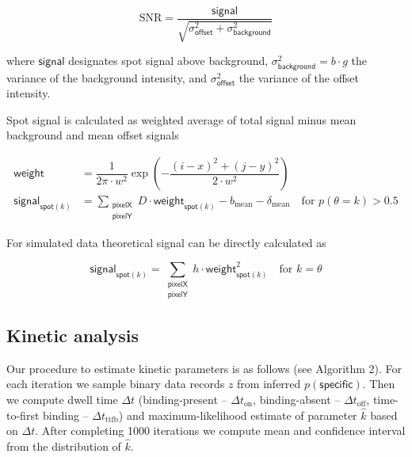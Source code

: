 \begin{equation}
    \mathrm{SNR} = \dfrac{\mathsf{signal}}{\sqrt{\sigma^2_{\mathsf{offset}} + \sigma^2_{\mathsf{background}}}}
\end{equation}

where $\mathsf{signal}$ designates spot signal above background, $\sigma^2_{\mathsf{background}} = b \cdot g$ the variance of the background intensity, and $\sigma^2_{\mathsf{offset}}$ the variance of the offset intensity.

Spot signal is calculated as weighted average of total signal minus mean background and mean offset signals

\begin{subequations}
\begin{align}
    \mathsf{weight} &= \dfrac{1}{2 \pi \cdot w^2} \exp{\left( -\dfrac{(i-x)^2 + (j-y)^2}{2 \cdot w^2} \right)} \\
    \mathsf{signal}_{\mathsf{spot}(k)} &=  \sum_{\substack{\mathsf{pixelX} \\ \mathsf{pixelY}}} D \cdot \mathsf{weight}_{\mathsf{spot}(k)} - b_{\mathrm{mean}} - \delta_\mathrm{mean} \quad \textrm{for } p(\theta = k) > 0.5
\end{align}
\end{subequations}

For simulated data theoretical signal can be directly calculated as

\begin{equation}
    \mathsf{signal}_{\mathsf{spot}(k)} =  \sum_{\substack{\mathsf{pixelX} \\ \mathsf{pixelY}}} h \cdot \mathsf{weight}_{\mathsf{spot}(k)}^2 \quad \textrm{for } k = \theta
\end{equation}

\subsection*{Kinetic analysis}

Our procedure to estimate kinetic parameters is as follows (see Algorithm 2). For each iteration we sample binary data records $z$ from inferred $p(\mathsf{specific})$. Then we compute dwell time $\Delta t$ (binding-present -- $\Delta t_\mathrm{on}$, binding-absent -- $\Delta t_\mathrm{off}$, time-to-first binding -- $\Delta t_\mathrm{ttfb}$) and maximum-likelihood estimate of parameter $\hat{k}$ based on $\Delta t$. After completing 1000 iterations we compute mean and confidence interval from the distribution of $\hat{k}$.

